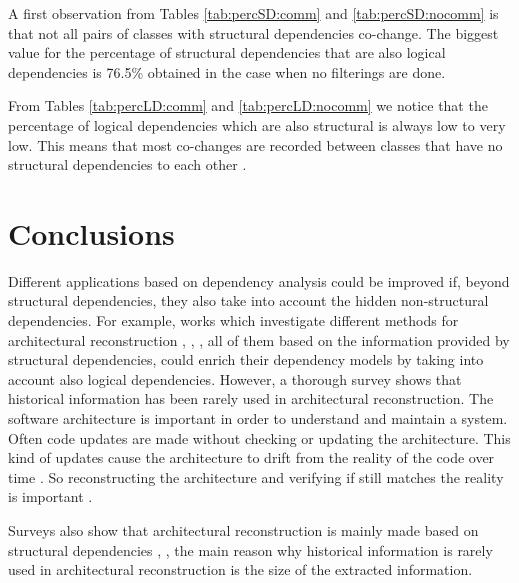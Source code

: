 \documentclass[12pt]{mitthesis}
\begin{document}
A first observation from Tables \ref{tab:percSD:comm} and \ref{tab:percSD:nocomm} is that not all pairs of classes with structural dependencies co-change. The biggest value for the percentage of structural dependencies that are also logical dependencies is 76.5\% obtained in the case when no filterings are done.

From Tables \ref{tab:percLD:comm} and \ref{tab:percLD:nocomm} we notice that the percentage of logical dependencies which are also structural is always low to very low. This means that most co-changes are recorded between classes that have no structural dependencies to each other \cite{enase19}.   
 

\chapter{Conclusions}
\label{conclusions}

Different applications based on dependency analysis could be improved if, beyond structural dependencies, they also take into account the hidden non-structural dependencies. For example, works  which investigate different methods for architectural reconstruction \cite{SoraConti}, \cite{SoraSem13}, \cite{PagerankENASE},  all of them based on the information provided by structural dependencies, could enrich their dependency models by taking into account also logical dependencies. However, a thorough survey \cite{sar} shows that historical information has been rarely used in architectural reconstruction. 
The software architecture is important in order to understand and maintain a system. Often code updates are made without checking or updating the architecture. This kind of updates cause the architecture to drift from the reality of the code over time \cite{sar}.
So reconstructing the architecture and verifying if still matches the reality is important \cite{Kalliamvakou2016}. 

Surveys also show that architectural reconstruction is mainly made based on structural dependencies \cite{Shtern:2012:CMS:2332427.2332428}, \cite{sar}, the main reason why historical information is rarely used in architectural reconstruction is the size of the extracted information.





\end{document}
